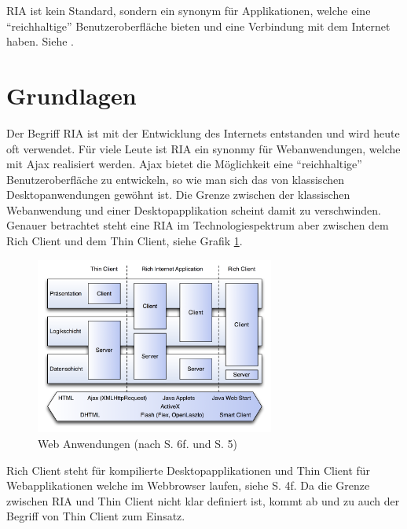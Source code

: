   \ac{RIA} ist kein Standard, sondern ein synonym für Applikationen, welche
  eine ``reichhaltige'' Benutzeroberfläche bieten und eine Verbindung mit dem
  Internet haben. Siehe \cite{RichInternetApplication}.
  
  \section{Grundlagen}
  
  Der Begriff \ac{RIA} ist mit der Entwicklung des Internets entstanden und
  wird heute oft verwendet. Für viele Leute ist \ac{RIA} ein synonmy für
  Webanwendungen, welche mit \ac{Ajax} realisiert werden. \ac{Ajax} bietet die
  Möglichkeit eine ``reichhaltige'' Benutzeroberfläche zu entwickeln, so wie
  man sich das von klassischen Desktopanwendungen gewöhnt ist. Die Grenze
  zwischen der klassischen Webanwendung und einer Desktopapplikation scheint
  damit zu verschwinden. Genauer betrachtet steht eine \ac{RIA} im
  Technologiespektrum aber zwischen dem Rich Client und dem Thin Client, siehe
  Grafik \ref{img:webanwendungen}.
  
  \begin{figure}[h]
    \begin{center}
      \includegraphics[width=0.7\textwidth]{./image/webanwendungen.png}
      \caption{Web Anwendungen (nach \cite{DiplomarbeitStephanSchuster} S. 6f.
      und \cite{WebApplicationSolutions} S. 5)}
      \label{img:webanwendungen}
    \end{center}
  \end{figure}
  
  Rich Client steht für kompilierte Desktopapplikationen und Thin Client für
  Webapplikationen welche im Webbrowser laufen, siehe
  \cite{WebApplicationSolutions} S. 4f. Da die Grenze zwischen \ac{RIA} und
  Thin Client nicht klar definiert ist, kommt ab und zu auch der Begriff von
  Thin Client zum Einsatz.
  
